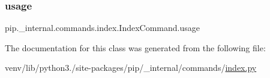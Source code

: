 \subsubsection{\texorpdfstring{usage}{usage}}
{\footnotesize\ttfamily pip.\+\_\+internal.\+commands.\+index.\+Index\+Command.\+usage\hspace{0.3cm}{\ttfamily [static]}}



The documentation for this class was generated from the following file\+:\begin{DoxyCompactItemize}
\item 
venv/lib/python3./site-\/packages/pip/\+\_\+internal/commands/\hyperlink{__internal_2commands_2index_8py}{index.\+py}\end{DoxyCompactItemize}
